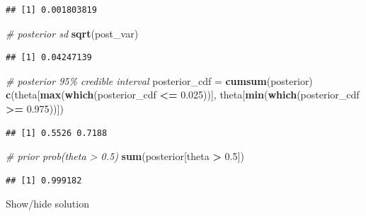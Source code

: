 \documentclass[
]{book}
\newenvironment{Shaded}{\begin{snugshade}}{\end{snugshade}}
\newcommand{\CommentTok}[1]{\textcolor[rgb]{0.56,0.35,0.01}{\textit{#1}}}
\newcommand{\FloatTok}[1]{\textcolor[rgb]{0.00,0.00,0.81}{#1}}
\newcommand{\KeywordTok}[1]{\textcolor[rgb]{0.13,0.29,0.53}{\textbf{#1}}}
\newcommand{\NormalTok}[1]{#1}
\newcommand{\OperatorTok}[1]{\textcolor[rgb]{0.81,0.36,0.00}{\textbf{#1}}}
\newcommand{\StringTok}[1]{\textcolor[rgb]{0.31,0.60,0.02}{#1}}
\theoremstyle{definition}
\theoremstyle{definition}
\theoremstyle{definition}
\theoremstyle{remark}
\begin{document}
\begin{verbatim}
## [1] 0.001803819
\end{verbatim}

\begin{Shaded}
\begin{Highlighting}[]
\CommentTok{\# posterior sd}
\KeywordTok{sqrt}\NormalTok{(post\_var)}
\end{Highlighting}
\end{Shaded}

\begin{verbatim}
## [1] 0.04247139
\end{verbatim}

\begin{Shaded}
\begin{Highlighting}[]
\CommentTok{\# posterior 95\% credible interval}
\NormalTok{posterior\_cdf =}\StringTok{ }\KeywordTok{cumsum}\NormalTok{(posterior)}
\KeywordTok{c}\NormalTok{(theta[}\KeywordTok{max}\NormalTok{(}\KeywordTok{which}\NormalTok{(posterior\_cdf }\OperatorTok{\textless{}=}\StringTok{ }\FloatTok{0.025}\NormalTok{))], theta[}\KeywordTok{min}\NormalTok{(}\KeywordTok{which}\NormalTok{(posterior\_cdf }\OperatorTok{\textgreater{}=}\StringTok{ }\FloatTok{0.975}\NormalTok{))])}
\end{Highlighting}
\end{Shaded}

\begin{verbatim}
## [1] 0.5526 0.7188
\end{verbatim}

\begin{Shaded}
\begin{Highlighting}[]
\CommentTok{\# prior prob(theta \textgreater{} 0.5)}
\KeywordTok{sum}\NormalTok{(posterior[theta }\OperatorTok{\textgreater{}}\StringTok{ }\FloatTok{0.5}\NormalTok{])}
\end{Highlighting}
\end{Shaded}

\begin{verbatim}
## [1] 0.999182
\end{verbatim}

Show/hide solution
\end{document}

